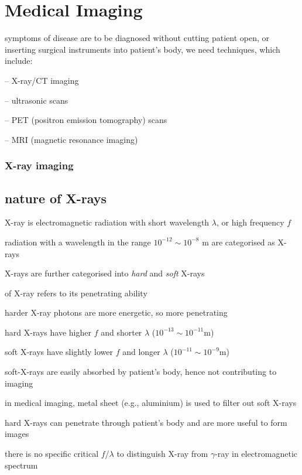 \chapter{Medical Imaging}

symptoms of disease are to be diagnosed without cutting patient open, or inserting surgical instruments into patient's body, we need  techniques, which include:

\begin{compactitem}
	\item[--] X-ray/CT imaging
	\item[--] ultrasonic scans
	\item[--] PET (positron emission tomography) scans
	\item[--] MRI (magnetic resonance imaging)
\end{compactitem}

\subsection{X-ray imaging}

\section{nature of X-rays}

X-ray is electromagnetic radiation with short wavelength $\lambda$, or high frequency $f$

radiation with a wavelength in the range $10^{-12}\sim10^{-8}\text{ m}$ are categorised as X-rays

\cmt X-rays are further categorised into \emph{hard} and \emph{soft} X-rays

 of X-ray refers to its penetrating ability

harder X-ray photons are more energetic, so more penetrating
	
hard X-rays have higher $f$ and shorter $\lambda$ ($10^{-13}\sim10^{-11}$m)
	
soft X-rays have slightly lower $f$ and longer $\lambda$ ($10^{-11}\sim10^{-9}$m)

\cmt soft-X-rays are easily absorbed by patient's body, hence not contributing to imaging

in medical imaging, metal sheet (e.g., aluminium) is used to filter out soft X-rays
	
hard X-rays can penetrate through patient's body and are more useful to form images
	
\cmt there is no specific critical $f$/$\lambda$ to distinguish X-ray from $\gamma$-ray in electromagnetic spectrum
	
